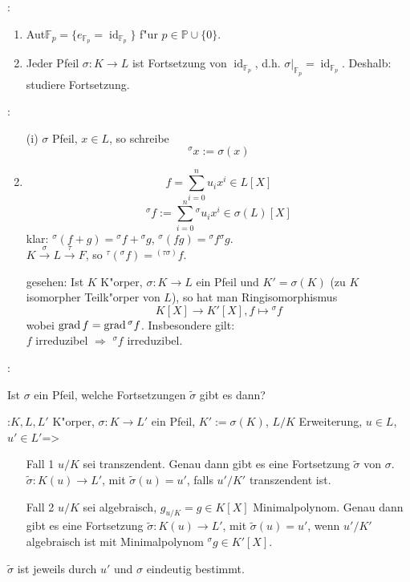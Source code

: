 :{ \begin{enumerate}
 \item Aut$\mathbb{F}_p=\{e_{\mathbb{F}_p}=\operatorname{id}_{\mathbb{F}_p}\}$
 f"ur $p\in \mathbb{P}\cup \{0\}$.
 \item Jeder Pfeil $\sigma: K\longrightarrow L$ ist Fortsetzung  von $\operatorname{id}_{\mathbb{F}_p}$,
 d.h. $\sigma|_{\mathbb{F}_p}=\operatorname{id}_{\mathbb{F}_p}$.
 Deshalb: studiere Fortsetzung.
 \end{enumerate} 
 }
\names{}:{\begin{enumerate}
 \item[(i)] $\sigma$ Pfeil, $x\in L$, so schreibe
 \[{}^{\sigma}x:=\sigma(x)\]
 \item \[f=\sum_{i=0}^{n}u_i x^i\in L[X]\] 
 \[{}^{\sigma}f:=\sum_{i=0}^n {}^{\sigma}u_i x^i\in \sigma(L)[X]\]
 klar: ${}^{\sigma}(f+g)={}^{\sigma}f+{}^{\sigma}g$, 
 ${}^{\sigma}(fg)={}^{\sigma}f{}^{\sigma}g$.\\
 $K\stackrel{\sigma}{\longrightarrow}L\stackrel{\tau}{\longrightarrow}F $,
 so ${}^{\tau}({}^{\sigma}f)={}^{(\tau\sigma)}f$.
 
 
 gesehen: Ist $K$ K"orper, $\sigma: K\longrightarrow L$ ein Pfeil und $K'=\sigma(K)$
 (zu $K$ isomorpher Teilk"orper von $L$), 
 so hat man Ringisomorphismus
 \[K[X]\longrightarrow K'[X], f\mapsto {}^{\sigma}f\]
 wobei  $\operatorname{grad} f= \operatorname{grad}{}^{\sigma}f$. Insbesondere gilt:\\
 $f$ irreduzibel $\Rightarrow$ ${}^{\sigma}f$ irreduzibel. 
 
 \end{enumerate} 
  }
\motivation{}:{Ist $\sigma$ ein Pfeil, welche Fortsetzungen $\tilde{\sigma}$ gibt es dann?

 }
:{$K,L,L'$ K"orper, 
 $\sigma:K\longrightarrow L'$ ein Pfeil, $K':=\sigma(K)$, $L/K$ Erweiterung, $u\in L$, $u'\in L'$}=>{
 \label{the_fortsetzungssatz_fuer_stammkoerper}
 \begin{enumerate}
 \item[Fall 1] $u/K$ sei transzendent. Genau dann gibt es eine Fortsetzung $\tilde{\sigma}$
 von $\sigma$. 
 $\tilde{\sigma} :K(u)\longrightarrow L'$, mit $\tilde{\sigma}(u)=u'$,
 falls $u'/K'$ transzendent ist.
 \item[Fall 2] $u/K$ sei algebraisch, $g_{u/K}=g\in K[X]$ Minimalpolynom. Genau dann
 gibt es eine Fortsetzung $\tilde{\sigma}:K(u)\longrightarrow L'$, mit 
 $\tilde{\sigma}(u)=u'$, wenn $u'/K'$ algebraisch ist mit Minimalpolynom ${}^{\sigma}g\in K'[X]$.
 \end{enumerate}
 $\tilde{\sigma}$ ist jeweils durch $u'$ und $\sigma$ eindeutig bestimmt.
 }   
